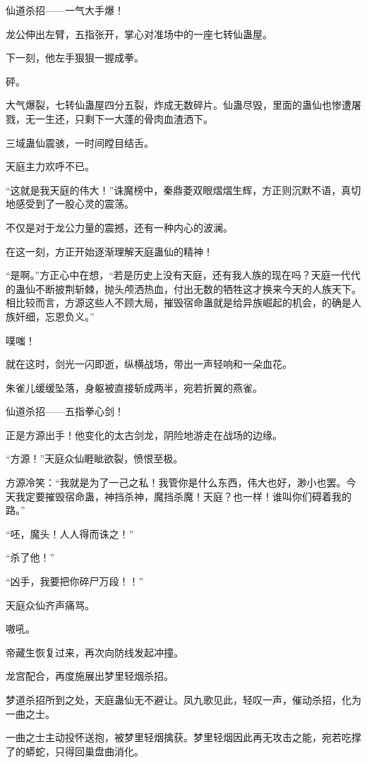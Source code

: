 \begin{this_body}
仙道杀招——一气大手爆！

龙公伸出左臂，五指张开，掌心对准场中的一座七转仙蛊屋。

下一刻，他左手狠狠一握成拳。

砰。

大气爆裂，七转仙蛊屋四分五裂，炸成无数碎片。仙蛊尽毁，里面的蛊仙也惨遭屠戮，无一生还，只剩下一大蓬的骨肉血渣洒下。

三域蛊仙震骇，一时间瞠目结舌。

天庭主力欢呼不已。

“这就是我天庭的伟大！”诛魔榜中，秦鼎菱双眼熠熠生辉，方正则沉默不语，真切地感受到了一股心灵的震荡。

不仅是对于龙公力量的震撼，还有一种内心的波澜。

在这一刻，方正开始逐渐理解天庭蛊仙的精神！

“是啊。”方正心中在想，“若是历史上没有天庭，还有我人族的现在吗？天庭一代代的蛊仙不断披荆斩棘，抛头颅洒热血，付出无数的牺牲这才换来今天的人族天下。相比较而言，方源这些人不顾大局，摧毁宿命蛊就是给异族崛起的机会，的确是人族奸细，忘恩负义。”

噗嗤！

就在这时，剑光一闪即逝，纵横战场，带出一声轻响和一朵血花。

朱雀儿缓缓坠落，身躯被直接斩成两半，宛若折翼的燕雀。

仙道杀招——五指拳心剑！

正是方源出手！他变化的太古剑龙，阴险地游走在战场的边缘。

“方源！”天庭众仙睚眦欲裂，愤恨至极。

方源冷笑：“我就是为了一己之私！我管你是什么东西，伟大也好，渺小也罢。今天我定要摧毁宿命蛊，神挡杀神，魔挡杀魔！天庭？也一样！谁叫你们碍着我的路。”

“呸，魔头！人人得而诛之！”

“杀了他！”

“凶手，我要把你碎尸万段！！”

天庭众仙齐声痛骂。

嗷吼。

帝藏生恢复过来，再次向防线发起冲撞。

龙宫配合，再度施展出梦里轻烟杀招。

梦道杀招所到之处，天庭蛊仙无不避让。凤九歌见此，轻叹一声，催动杀招，化为一曲之士。

一曲之士主动投怀送抱，被梦里轻烟擒获。梦里轻烟因此再无攻击之能，宛若吃撑了的蟒蛇，只得回巢盘曲消化。


\end{this_body}
